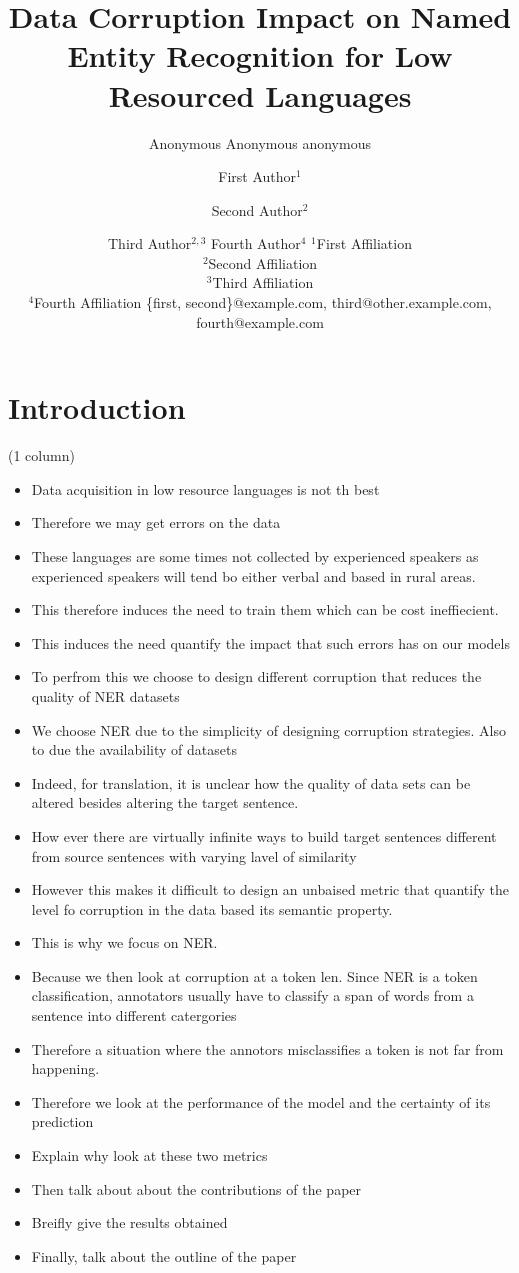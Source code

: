 \documentclass{article}
\title{Data Corruption Impact on Named Entity Recognition for Low Resourced Languages}
\author{
    Anonymous
    \affiliations
    Anonymous
    \emails
    anonymous
}
\author{
First Author$^1$
\and
Second Author$^2$\and
Third Author$^{2,3}$\And
Fourth Author$^4$
\affiliations
$^1$First Affiliation\\
$^2$Second Affiliation\\
$^3$Third Affiliation\\
$^4$Fourth Affiliation
\emails
\{first, second\}@example.com,
third@other.example.com,
fourth@example.com
}
\begin{document}
\maketitle

\begin{abstract}
\end{abstract}

\section{Introduction}
\label{sec:introduction}
(1 column)
\begin{itemize}
    \item Data acquisition in low resource languages is not th best
    \item Therefore we may get errors on the data
    \item These languages are some times not collected by experienced speakers as experienced speakers will tend bo either verbal and based in rural areas.
    \item This therefore induces the need to train them which can be cost ineffiecient.
    \item This induces the need quantify the impact that such errors has on our models
    \item To perfrom this we choose to design different corruption that reduces the quality of NER datasets
    \item We choose NER due to the simplicity of designing corruption strategies. Also to due the availability of datasets
    \item Indeed, for translation, it is unclear how the quality of data sets can be altered besides altering the target sentence.
    \item How ever there are virtually infinite ways to build target sentences different from source sentences with varying lavel of similarity
    \item However this makes it difficult to design an unbaised metric that quantify the level fo corruption in the data based its semantic property.
    \item This is why we focus on NER.
    \item Because we then look at corruption at a token len. Since NER is a token classification, annotators usually have to classify a span of words from a sentence into different catergories
    \item Therefore a situation where the annotors misclassifies a token is not far from happening.
    \item Therefore we look at the performance of the model and the certainty of its prediction
    \item Explain why look at these two metrics
    \item Then talk about about the contributions of the paper
    \item Breifly give the results obtained
    \item Finally, talk about the outline of the paper
\end{itemize}
\end{document}
